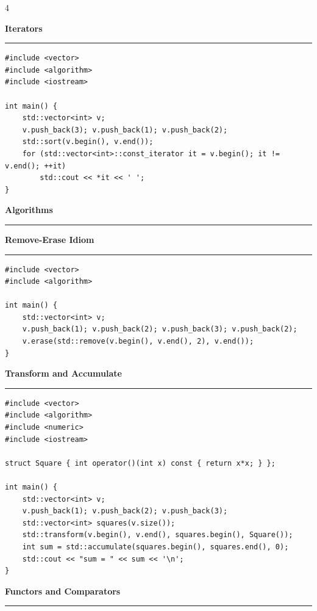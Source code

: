 \documentclass[final]{beamer}
\renewcommand{\section}[1]{%
  \par\vspace{1em}%
  {\noindent\Large\bfseries #1\par}%
  \vspace{0.5em}\hrule\vspace{1em}%
}
\renewcommand{\subsection}[1]{%
  \par\vspace{1em}%
  {\noindent\large\bfseries #1\par}%
  \vspace{0.5em}\hrule\vspace{1em}%
}
\begin{document}
\begin{frame}[t,fragile]
\begin{multicols}{4}
\section{Iterators}

\begin{lstlisting}
#include <vector>
#include <algorithm>
#include <iostream>

int main() {
    std::vector<int> v;
    v.push_back(3); v.push_back(1); v.push_back(2);
    std::sort(v.begin(), v.end());
    for (std::vector<int>::const_iterator it = v.begin(); it != v.end(); ++it)
        std::cout << *it << ' ';
}
\end{lstlisting}

\section{Algorithms}

\subsection{Remove-Erase Idiom}

\begin{lstlisting}
#include <vector>
#include <algorithm>

int main() {
    std::vector<int> v;
    v.push_back(1); v.push_back(2); v.push_back(3); v.push_back(2);
    v.erase(std::remove(v.begin(), v.end(), 2), v.end());
}
\end{lstlisting}

\subsection{Transform and Accumulate}

\begin{lstlisting}
#include <vector>
#include <algorithm>
#include <numeric>
#include <iostream>

struct Square { int operator()(int x) const { return x*x; } };

int main() {
    std::vector<int> v;
    v.push_back(1); v.push_back(2); v.push_back(3);
    std::vector<int> squares(v.size());
    std::transform(v.begin(), v.end(), squares.begin(), Square());
    int sum = std::accumulate(squares.begin(), squares.end(), 0);
    std::cout << "sum = " << sum << '\n';
}
\end{lstlisting}

\section{Functors and Comparators}


\end{multicols}
\end{frame}
\end{document}
